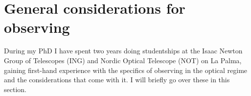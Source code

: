 \documentclass[a4paper,oneside,12pt, class=Latex/Classes/PhDthesisPSnPDF, crop=false]{standalone}
\begin{document}


\section{General considerations for observing}
\label{considerations}
During my PhD I have spent two years doing studentships at the Isaac Newton Group of Telescopes (ING) and Nordic Optical Telescope (NOT) on La Palma, gaining first-hand experience with the specifics of observing in the optical regime and the considerations that come with it. I will briefly go over these in this section.

\end{document}
